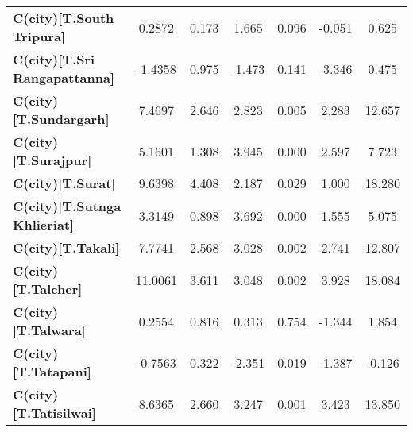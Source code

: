 \begin{center}
\begin{tabular}{lcccccc}
\textbf{C(city)[T.South Tripura]}                                                                   &       0.2872  &        0.173     &     1.665  &         0.096        &       -0.051    &        0.625     \\
\textbf{C(city)[T.Sri Rangapattanna]}                                                               &      -1.4358  &        0.975     &    -1.473  &         0.141        &       -3.346    &        0.475     \\
\textbf{C(city)[T.Sundargarh]}                                                                      &       7.4697  &        2.646     &     2.823  &         0.005        &        2.283    &       12.657     \\
\textbf{C(city)[T.Surajpur]}                                                                        &       5.1601  &        1.308     &     3.945  &         0.000        &        2.597    &        7.723     \\
\textbf{C(city)[T.Surat]}                                                                           &       9.6398  &        4.408     &     2.187  &         0.029        &        1.000    &       18.280     \\
\textbf{C(city)[T.Sutnga Khlieriat]}                                                                &       3.3149  &        0.898     &     3.692  &         0.000        &        1.555    &        5.075     \\
\textbf{C(city)[T.Takali]}                                                                          &       7.7741  &        2.568     &     3.028  &         0.002        &        2.741    &       12.807     \\
\textbf{C(city)[T.Talcher]}                                                                         &      11.0061  &        3.611     &     3.048  &         0.002        &        3.928    &       18.084     \\
\textbf{C(city)[T.Talwara]}                                                                         &       0.2554  &        0.816     &     0.313  &         0.754        &       -1.344    &        1.854     \\
\textbf{C(city)[T.Tatapani]}                                                                        &      -0.7563  &        0.322     &    -2.351  &         0.019        &       -1.387    &       -0.126     \\
\textbf{C(city)[T.Tatisilwai]}                                                                      &       8.6365  &        2.660     &     3.247  &         0.001        &        3.423    &       13.850     \\

\end{tabular}
\end{center}
